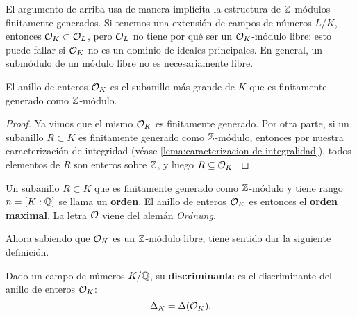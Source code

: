 \begin{comentario}
  El argumento de arriba usa de manera implícita la estructura de $\mathbb{Z}$-módulos
  finitamente generados. Si tenemos una extensión de campos de números $L/K$,
  entonces $\mathcal{O}_K \subset \mathcal{O}_L$, pero $\mathcal{O}_L$ no tiene por qué ser un
  $\mathcal{O}_K$-módulo libre: esto puede fallar si $\mathcal{O}_K$ no es un dominio de ideales
  principales. En general, un submódulo de un módulo libre no es necesariamente
  libre.
\end{comentario}

\begin{corolario}
  El anillo de enteros $\mathcal{O}_K$ es el subanillo más grande de $K$ que es
  finitamente generado como $\mathbb{Z}$-módulo.

  \begin{proof}
    Ya vimos que el mismo $\mathcal{O}_K$ es finitamente generado. Por otra parte, si
    un subanillo $R \subset K$ es finitamente generado como $\mathbb{Z}$-módulo,
    entonces por nuestra caracterización de integridad
    (véase \ref{lema:caracterizacion-de-integralidad}), todos elementos de $R$
    son enteros sobre $\mathbb{Z}$, y luego $R \subseteq \mathcal{O}_K$.
  \end{proof}
\end{corolario}

Un subanillo $R \subset K$ que es finitamente generado como $\mathbb{Z}$-módulo y tiene
rango $n = [K : \mathbb{Q}]$ se llama un \textbf{orden}. El anillo de enteros $\mathcal{O}_K$ es
entonces el \textbf{orden maximal}. La letra $\mathcal{O}$ viene del alemán
\emph{Ordnung}.

\vspace{1em}

Ahora sabiendo que $\mathcal{O}_K$ es un $\mathbb{Z}$-módulo libre, tiene sentido dar
la siguiente definición.

\begin{definicion}
  Dado un campo de números $K/\mathbb{Q}$, su \textbf{discriminante} es el
  discriminante del anillo de enteros $\mathcal{O}_K$:
  $$\Delta_K = \Delta (\mathcal{O}_K).$$
\end{definicion}

